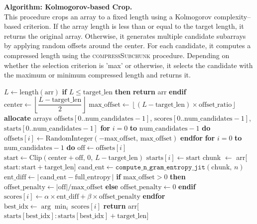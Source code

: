 \documentclass{article}
\theoremstyle{remark}
\begin{document}
\noindent
\textbf{Algorithm: Kolmogorov-based Crop.}\\
This procedure crops an array to a fixed length using a Kolmogorov complexity–based criterion. If the array length is less than or equal to the target length, it returns the original array. Otherwise, it generates multiple candidate subarrays by applying random offsets around the center. For each candidate, it computes a compressed length using the \textsc{compressSubchunk} procedure. Depending on whether the selection criterion is 'max' or otherwise, it selects the candidate with the maximum or minimum compressed length and returns it.

\vspace{1em}

\begin{algorithm}[H]
\caption{Entropy-based Crop}
\begin{algorithmic}[1]
    \State $L \gets \mathrm{length}(\mathrm{arr})$
    \State \textbf{if} $L \leq \mathrm{target\_len}$ \textbf{then}
        \State \quad \textbf{return} arr
    \State \textbf{endif}
    \State $\mathrm{center} \gets \left\lfloor \dfrac{L - \mathrm{target\_len}}{2} \right\rfloor$
    \State $\mathrm{max\_offset} \gets \left\lfloor (L - \mathrm{target\_len})\times \mathrm{offset\_ratio} \right\rfloor$
    \State \textbf{allocate} arrays $\mathrm{offsets}[0..\mathrm{num\_candidates}-1]$, $\mathrm{scores}[0..\mathrm{num\_candidates}-1]$, $\mathrm{starts}[0..\mathrm{num\_candidates}-1]$
    \State \textbf{for} $i=0$ \textbf{to} $\mathrm{num\_candidates}-1$ \textbf{do}
        \State \quad $\mathrm{offsets}[i] \gets \mathrm{RandomInteger}(-\mathrm{max\_offset},\, \mathrm{max\_offset})$
    \State \textbf{endfor}
    \State \textbf{for} $i=0$ \textbf{to} $\mathrm{num\_candidates}-1$ \textbf{do}
        \State \quad $\mathrm{off} \gets \mathrm{offsets}[i]$
        \State \quad $\mathrm{start} \gets \mathrm{Clip}(\mathrm{center} + \mathrm{off},\, 0,\, L - \mathrm{target\_len})$
        \State \quad $\mathrm{starts}[i] \gets \mathrm{start}$
        \State \quad chunk $\gets$ arr[$\mathrm{start} : \mathrm{start} + \mathrm{target\_len}$]
        \State \quad $\mathrm{cand\_ent} \gets \texttt{compute\_n\_gram\_entropy\_jit}(\mathrm{chunk},\, n)$ 
        \State \quad $\mathrm{ent\_diff} \gets \bigl|\,\mathrm{cand\_ent} - \mathrm{full\_entropy}\,\bigr|$
        \State \quad \textbf{if} $\mathrm{max\_offset} > 0$ \textbf{then}
            \State \qquad $\mathrm{offset\_penalty} \gets |\mathrm{off}|/\mathrm{max\_offset}$
        \State \quad \textbf{else}
            \State \qquad $\mathrm{offset\_penalty} \gets 0$
        \State \quad \textbf{endif}
        \State \quad $\mathrm{scores}[i] \gets \alpha \times \mathrm{ent\_diff} + \beta \times \mathrm{offset\_penalty}$
    \State \textbf{endfor}
    \State $\mathrm{best\_idx} \gets \arg\min_i \,\mathrm{scores}[i]$
    \State \textbf{return} arr[$\mathrm{starts}[\mathrm{best\_idx}] : \mathrm{starts}[\mathrm{best\_idx}] + \mathrm{target\_len}$]
\EndProcedure
\end{algorithmic}
\end{algorithm}
\end{document}
